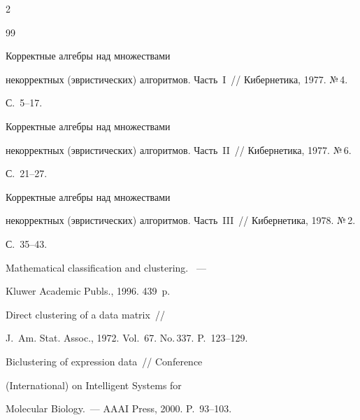 \begin{multicols}{2}
{\small\frenchspacing


 {%




 \begin{thebibliography}{99}




 Корректные алгебры над множествами 


некорректных (эвристических) алгоритмов.  Часть~I~// Кибернетика, 1977. №\,4. 


С.~5--17.







 Корректные алгебры над множествами 


некорректных (эвристических) алгоритмов.  Часть~II~// Кибернетика, 1977. №\,6. 


С.~21--27.







 Корректные алгебры над множествами 


некорректных (эвристических) алгоритмов.  Часть~III~// Кибернетика, 1978. №\,2. 


С.~35--43.







 Mathematical classification and clustering. ~--- 


Kluwer Academic Publs., 1996. 439~p.










 Direct clustering of a data matrix~// 


J.~Am. Stat. Assoc., 1972. Vol.~67. No.\,337. P.~123--129.









Biclustering of expression data~//  Conference


(International) on Intelligent Systems for 


Molecular Biology.~--- AAAI Press, 2000. P.~93--103.






\end{thebibliography}}}
\end{multicols}
